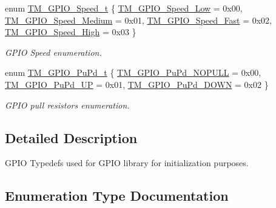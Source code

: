 \begin{DoxyCompactItemize}
\item 
enum \hyperlink{group___t_m___g_p_i_o___typedefs_gaa57736d106efbe14067be22025f296c4}{T\+M\+\_\+\+G\+P\+I\+O\+\_\+\+Speed\+\_\+t} \{ \hyperlink{group___t_m___g_p_i_o___typedefs_ggaa57736d106efbe14067be22025f296c4a20d05d373e1340842eceec7760ac369d}{T\+M\+\_\+\+G\+P\+I\+O\+\_\+\+Speed\+\_\+\+Low} = 0x00, 
\hyperlink{group___t_m___g_p_i_o___typedefs_ggaa57736d106efbe14067be22025f296c4aa566a49f42b266b30db1a52563bfbd8c}{T\+M\+\_\+\+G\+P\+I\+O\+\_\+\+Speed\+\_\+\+Medium} = 0x01, 
\hyperlink{group___t_m___g_p_i_o___typedefs_ggaa57736d106efbe14067be22025f296c4ada5e219c39bf024f3bbe49506e67f980}{T\+M\+\_\+\+G\+P\+I\+O\+\_\+\+Speed\+\_\+\+Fast} = 0x02, 
\hyperlink{group___t_m___g_p_i_o___typedefs_ggaa57736d106efbe14067be22025f296c4ad6747b6108c911e7c9d7f6d0e8c963df}{T\+M\+\_\+\+G\+P\+I\+O\+\_\+\+Speed\+\_\+\+High} = 0x03
 \}\begin{DoxyCompactList}\small\item\em G\+P\+IO Speed enumeration. \end{DoxyCompactList}
\item 
enum \hyperlink{group___t_m___g_p_i_o___typedefs_ga50ddb0da56d8a388dee368c55e968602}{T\+M\+\_\+\+G\+P\+I\+O\+\_\+\+Pu\+Pd\+\_\+t} \{ \hyperlink{group___t_m___g_p_i_o___typedefs_gga50ddb0da56d8a388dee368c55e968602a6efe40eb21f3c2293447c9435ffee2e1}{T\+M\+\_\+\+G\+P\+I\+O\+\_\+\+Pu\+Pd\+\_\+\+N\+O\+P\+U\+LL} = 0x00, 
\hyperlink{group___t_m___g_p_i_o___typedefs_gga50ddb0da56d8a388dee368c55e968602a5b672ef3d371a292b13edd4e357ef80f}{T\+M\+\_\+\+G\+P\+I\+O\+\_\+\+Pu\+Pd\+\_\+\+UP} = 0x01, 
\hyperlink{group___t_m___g_p_i_o___typedefs_gga50ddb0da56d8a388dee368c55e968602a5cb8e93ea6abd639ba7efaf9b37f3bd8}{T\+M\+\_\+\+G\+P\+I\+O\+\_\+\+Pu\+Pd\+\_\+\+D\+O\+WN} = 0x02
 \}\begin{DoxyCompactList}\small\item\em G\+P\+IO pull resistors enumeration. \end{DoxyCompactList}
\end{DoxyCompactItemize}


\subsection{Detailed Description}
G\+P\+IO Typedefs used for G\+P\+IO library for initialization purposes. 



\subsection{Enumeration Type Documentation}
\mbox{\label{group___t_m___g_p_i_o___typedefs_gacbb363a57d0e70ea563e494eff1db3ca}} 
